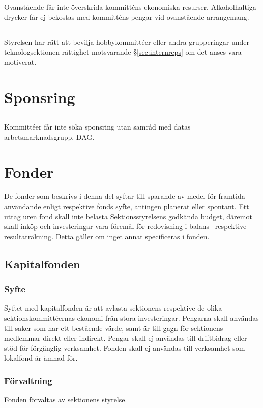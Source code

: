 \documentclass[a4paper, 10pt]{article}
\begin{document}
Ovanstående får inte överskrida kommitténs ekonomiska resurser. Alkoholhaltiga drycker får ej bekostas med kommitténs pengar vid ovanstående arrangemang.

\subsection{}
Styrelsen har rätt att bevilja hobbykommittéer eller andra grupperingar under teknologsektionen rättighet motsvarande \S\ref{sec:internreps} om det anses vara motiverat.

\section{Sponsring}
\subsection{}
Kommittéer får inte söka sponsring utan samråd med datas
arbetsmarknadsgrupp, DAG.

\section{Fonder}
De fonder som beskrivs i denna del syftar till sparande av medel för framtida användande enligt respektive fonds syfte, antingen planerat eller spontant. Ett uttag uren fond skall inte belasta Sektionsstyrelsens godkända budget, däremot skall inköp och investeringar vara föremål för redovisning i balans– respektive resultaträkning. Detta gäller om inget annat specificeras i fonden.
\subsection{Kapitalfonden}
\subsubsection{Syfte}
\label{sec:kapitalfond_syfte}
Syftet med kapitalfonden är att avlasta sektionens respektive de olika sektionskommittéernas ekonomi från stora investeringar. Pengarna skall användas till saker som har ett bestående värde, samt är till gagn för sektionens medlemmar direkt eller indirekt. Pengar skall ej användas till driftbidrag eller stöd för förgänglig verksamhet. Fonden skall ej användas till verksamhet som lokalfond är ämnad för.
\subsubsection{Förvaltning}
Fonden förvaltas av sektionens styrelse.
\end{document}

